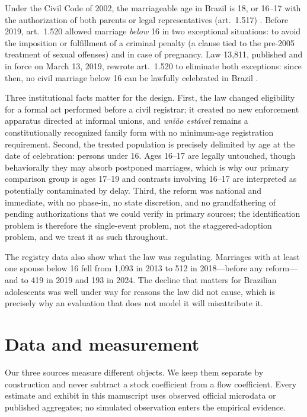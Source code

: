 \documentclass[12pt]{article}
\begin{document}
Under the Civil Code of 2002, the marriageable age in Brazil is 18, or 16--17 with the
authorization of both parents or legal representatives (art.~1.517)
\citep{CodigoCivil2002}. Before 2019, art.~1.520 allowed marriage \emph{below} 16 in two
exceptional situations: to avoid the imposition or fulfillment of a criminal penalty (a
clause tied to the pre-2005 treatment of sexual offenses) and in case of pregnancy. Law
13,811, published and in force on March 13, 2019, rewrote art.~1.520 to eliminate both
exceptions: since then, no civil marriage below 16 can be lawfully celebrated in Brazil
\citep{Lei13811}.

Three institutional facts matter for the design. First, the law changed eligibility for a
formal act performed before a civil registrar; it created no new enforcement apparatus
directed at informal unions, and \emph{uni\~ao est\'avel} remains a constitutionally
recognized family form with no minimum-age registration requirement. Second, the treated
population is precisely delimited by age at the date of celebration: persons under 16.
Ages 16--17 are legally untouched, though behaviorally they may absorb postponed
marriages, which is why our primary comparison group is ages 17--19 and contrasts
involving 16--17 are interpreted as potentially contaminated by delay. Third, the reform
was national and immediate, with no phase-in, no state discretion, and no
grandfathering of pending authorizations that we could verify in primary sources; the
identification problem is therefore the single-event problem, not the staggered-adoption
problem, and we treat it as such throughout.

The registry data also show what the law was regulating. Marriages with at least one
spouse below 16 fell from 1,093 in 2013 to 512 in 2018---before any reform---and to 419
in 2019 and 193 in 2024. The decline that matters for Brazilian adolescents was well
under way for reasons the law did not cause, which is precisely why an evaluation that
does not model it will misattribute it.

\section{Data and measurement}\label{sec:data}

Our three sources measure different objects. We keep them separate by construction and
never subtract a stock coefficient from a flow coefficient. Every estimate and exhibit
in this manuscript uses observed official microdata or published aggregates; no
simulated observation enters the empirical evidence.
\end{document}
